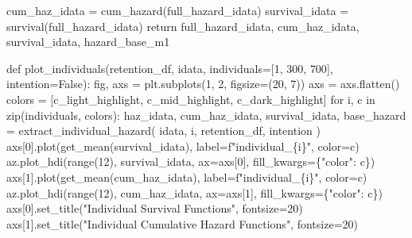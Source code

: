 \documentclass[
  letterpaper,
  DIV=11,
  numbers=noendperiod]{scrartcl}
\newenvironment{Shaded}{\begin{snugshade}}{\end{snugshade}}
\newcommand{\BuiltInTok}[1]{\textcolor[rgb]{0.00,0.23,0.31}{#1}}
\newcommand{\ControlFlowTok}[1]{\textcolor[rgb]{0.00,0.23,0.31}{#1}}
\newcommand{\DecValTok}[1]{\textcolor[rgb]{0.68,0.00,0.00}{#1}}
\newcommand{\KeywordTok}[1]{\textcolor[rgb]{0.00,0.23,0.31}{#1}}
\newcommand{\NormalTok}[1]{\textcolor[rgb]{0.00,0.23,0.31}{#1}}
\newcommand{\OperatorTok}[1]{\textcolor[rgb]{0.37,0.37,0.37}{#1}}
\newcommand{\SpecialCharTok}[1]{\textcolor[rgb]{0.37,0.37,0.37}{#1}}
\newcommand{\SpecialStringTok}[1]{\textcolor[rgb]{0.13,0.47,0.30}{#1}}
\newcommand{\StringTok}[1]{\textcolor[rgb]{0.13,0.47,0.30}{#1}}
\newcommand{\VariableTok}[1]{\textcolor[rgb]{0.07,0.07,0.07}{#1}}
\begin{document}
\begin{Shaded}
\begin{Highlighting}[]
\NormalTok{    cum\_haz\_idata }\OperatorTok{=}\NormalTok{ cum\_hazard(full\_hazard\_idata)}
\NormalTok{    survival\_idata }\OperatorTok{=}\NormalTok{ survival(full\_hazard\_idata)}
    \ControlFlowTok{return}\NormalTok{ full\_hazard\_idata, cum\_haz\_idata, survival\_idata, hazard\_base\_m1}


\KeywordTok{def}\NormalTok{ plot\_individuals(retention\_df, idata, individuals}\OperatorTok{=}\NormalTok{[}\DecValTok{1}\NormalTok{, }\DecValTok{300}\NormalTok{, }\DecValTok{700}\NormalTok{], intention}\OperatorTok{=}\VariableTok{False}\NormalTok{):}
\NormalTok{    fig, axs }\OperatorTok{=}\NormalTok{ plt.subplots(}\DecValTok{1}\NormalTok{, }\DecValTok{2}\NormalTok{, figsize}\OperatorTok{=}\NormalTok{(}\DecValTok{20}\NormalTok{, }\DecValTok{7}\NormalTok{))}
\NormalTok{    axs }\OperatorTok{=}\NormalTok{ axs.flatten()}
\NormalTok{    colors }\OperatorTok{=}\NormalTok{ [c\_light\_highlight, c\_mid\_highlight, c\_dark\_highlight]}
    \ControlFlowTok{for}\NormalTok{ i, c }\KeywordTok{in} \BuiltInTok{zip}\NormalTok{(individuals, colors):}
\NormalTok{        haz\_idata, cum\_haz\_idata, survival\_idata, base\_hazard }\OperatorTok{=}\NormalTok{ extract\_individual\_hazard(}
\NormalTok{            idata, i, retention\_df, intention}
\NormalTok{        )}
\NormalTok{        axs[}\DecValTok{0}\NormalTok{].plot(get\_mean(survival\_idata), label}\OperatorTok{=}\SpecialStringTok{f"individual\_}\SpecialCharTok{\{}\NormalTok{i}\SpecialCharTok{\}}\SpecialStringTok{"}\NormalTok{, color}\OperatorTok{=}\NormalTok{c)}
\NormalTok{        az.plot\_hdi(}\BuiltInTok{range}\NormalTok{(}\DecValTok{12}\NormalTok{), survival\_idata, ax}\OperatorTok{=}\NormalTok{axs[}\DecValTok{0}\NormalTok{], fill\_kwargs}\OperatorTok{=}\NormalTok{\{}\StringTok{"color"}\NormalTok{: c\})}
\NormalTok{        axs[}\DecValTok{1}\NormalTok{].plot(get\_mean(cum\_haz\_idata), label}\OperatorTok{=}\SpecialStringTok{f"individual\_}\SpecialCharTok{\{}\NormalTok{i}\SpecialCharTok{\}}\SpecialStringTok{"}\NormalTok{, color}\OperatorTok{=}\NormalTok{c)}
\NormalTok{        az.plot\_hdi(}\BuiltInTok{range}\NormalTok{(}\DecValTok{12}\NormalTok{), cum\_haz\_idata, ax}\OperatorTok{=}\NormalTok{axs[}\DecValTok{1}\NormalTok{], fill\_kwargs}\OperatorTok{=}\NormalTok{\{}\StringTok{"color"}\NormalTok{: c\})}
\NormalTok{        axs[}\DecValTok{0}\NormalTok{].set\_title(}\StringTok{"Individual Survival Functions"}\NormalTok{, fontsize}\OperatorTok{=}\DecValTok{20}\NormalTok{)}
\NormalTok{        axs[}\DecValTok{1}\NormalTok{].set\_title(}\StringTok{"Individual Cumulative Hazard Functions"}\NormalTok{, fontsize}\OperatorTok{=}\DecValTok{20}\NormalTok{)}

\end{Highlighting}
\end{Shaded}
\end{document}
